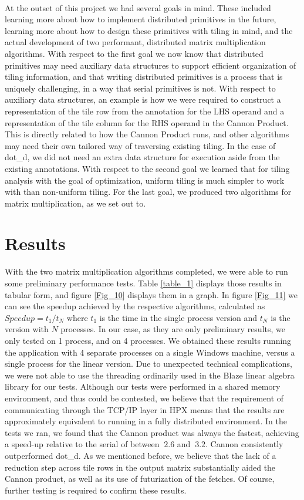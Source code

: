 %

\label{chap:intro}
\paragraph{}
At the outset of this project we had several goals in mind. These included learning more about how to implement distributed primitives in the future, learning more about how to design these primitives with tiling in mind, and the actual development of two performant, distributed matrix multiplication algorithms. With respect to the first goal we now know that distributed primitives may need auxiliary data structures to support efficient organization of tiling information, and that writing distributed primitives is a process that is uniquely challenging, in a way that serial primitives is not. With respect to auxiliary data structures, an example is how we were required to construct a representation of the tile row from the annotation for the LHS operand and a representation of the tile column for the RHS operand in the Cannon Product. This is directly related to how the Cannon Product runs, and other algorithms may need their own tailored way of traversing existing tiling. In the case of dot\_d, we did not need an extra data structure for execution aside from the existing annotations. With respect to the second goal we learned that for tiling analysis with the goal of optimization, uniform tiling is much simpler to work with than non-uniform tiling. For the last goal, we produced two algorithms for matrix multiplication, as we set out to.
\section{Results}
With the two matrix multiplication algorithms completed, we were able to run some preliminary performance tests. Table \ref{table_1} displays those results in tabular form, and figure \ref{Fig_10} displays them in a graph. In figure \ref{Fig_11} we can see the speedup achieved by the respective algorithms, calculated as $Speedup = t_1/t_N$ where $t_1$ is the time in the single process version and $t_N$ is the version with $N$ processes. In our case, as they are only preliminary results, we only tested on 1 process, and on 4 processes. We obtained these results running the application with 4 separate processes on a single Windows machine, versus a single process for the linear version. Due to unexpected technical complications, we were not able to use the threading ordinarily used in the Blaze linear algebra library for our tests. Although our tests were performed in a shared memory environment, and thus could be contested, we believe that the requirement of communicating through the TCP/IP layer in HPX means that the results are approximately equivalent to running in a fully distributed environment. In the tests we ran, we found that the Cannon product was always the fastest, achieving a speed-up relative to the serial of between $~2.6$ and $~3.2$. Cannon consistently outperformed dot\_d. As we mentioned before, we believe that the lack of a reduction step across tile rows in the output matrix substantially aided the Cannon product, as well as its use of futurization of the fetches. Of course, further testing is required to confirm these results.


